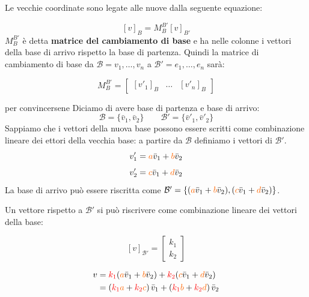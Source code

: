\documentclass[x11names]{article}
\begin{document}
\noindent
Le vecchie coordinate sono legate alle nuove dalla seguente equazione:

\[
\left[v\right]_{B} = M_{B}^{B'} \left[v\right]_{B'}
\] 
$M_{B}^{B'}$ è detta  \textbf{matrice del cambiamento di base} e ha nelle colonne i vettori della base di arrivo rispetto la base di partenza. Quindi la matrice di cambiamento di base da $\mathscr{B} = {v_1,\dots,v_{n}}$ a $\mathscr{B}' = {e_{1},\dots,e_{n}}$ sarà:


\[
M_{B}^{B'} =
\left[\begin{array}{c|c|c}
     \left[v'_1\right]_{B}
&  \dots & \left[v'_{n}\right]_{B}
\end{array}
\right]
\] 

\begin{es}{per convincersene}
Diciamo di avere base di partenza e base di arrivo:
\[
\mathscr{B} = \{\bar{v}_{1},\bar{v}_{2}\} \qquad \mathscr{B}' = \{\bar{v}'_{1},\bar{v}'_{2}\}
\]
Sappiamo che i vettori della nuova base possono essere scritti come combinazione lineare dei ettori della vecchia base: a partire da $\mathcal{B}$ definiamo i vettori di $\mathcal{B}'$.
\[
v'_{1} = \textcolor{myorange}{a}\bar{v}_{1} + \textcolor{myorange}{b}\bar{v}_{2}
\]
\[
v'_{2} = \textcolor{myorange}{c}\bar{v}_{1} + \textcolor{myorange}{d}\bar{v}_{2}
\]
La base di arrivo può essere riscritta come $ \mathcal{B}' = \left\{(\textcolor{myorange}{a}\bar{v}_{1} + \textcolor{myorange}{b}\bar{v}_{2}),(\textcolor{myorange}{c}\bar{v}_{1} + \textcolor{myorange}{d}\bar{v}_{2}) \right\}$.

Un vettore rispetto a $\mathcal{B}'$ si può riscrivere come combinazione lineare dei vettori della base:

\[
\left[v\right]_{\mathcal{B}'}  = \left[\begin{array}{c}
		k_{1} \\ k_{2}
\end{array} \right]
\]

\begin{align*}
	v &= \textcolor{red}{k_{1}}(\textcolor{myorange}{a}\bar{v}_{1} + \textcolor{myorange}{b}\bar{v}_{2}) + \textcolor{red}{k_{2}}(\textcolor{myorange}{c}\bar{v}_{1} + \textcolor{myorange}{d}\bar{v}_{2}) \\
	&= \left(\textcolor{red}{k_{1}}\textcolor{myorange}{a} + \textcolor{red}{k_{2}}\textcolor{myorange}{c}\right)\bar{v}_{1} + 
	\left(\textcolor{red}{k_{1}}\textcolor{myorange}{b} + \textcolor{red}{k_{2}}\textcolor{myorange}{d} \right)\bar{v}_{2} 
\end{align*}
\end{es}
\end{document}
